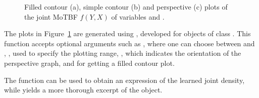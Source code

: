 \begin{figure}[htb]     
	\centering
	\caption{Filled contour (a), simple contour (b) and perspective (c) plots of the joint MoTBF $f(Y,X)$ of variables  and .}
	\label{fig:joint}
\end{figure}

The plots in Figure~\ref{fig:joint} are generated using , developed for objects of class 
. This function accepts optional arguments such as , where one can choose between 
 and , , used to specify the plotting range, , which 
indicates the orientation of the perspective graph, and  for getting a filled contour plot.

The function  can be used to obtain an expression of the learned joint density, while 
 yields a more thorough excerpt of the  object.


